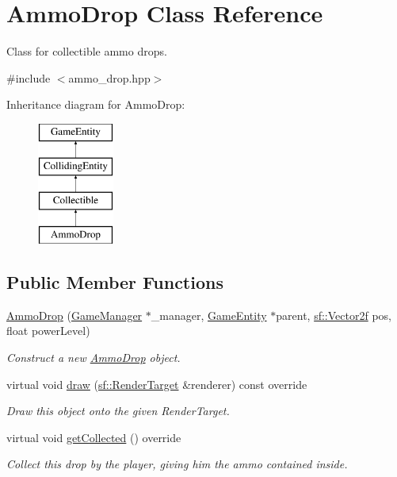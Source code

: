 \hypertarget{class_ammo_drop}{}\section{Ammo\+Drop Class Reference}
\label{class_ammo_drop}


Class for collectible ammo drops.  




{\ttfamily \#include $<$ammo\+\_\+drop.\+hpp$>$}

Inheritance diagram for Ammo\+Drop\+:\begin{figure}[H]
\begin{center}
\leavevmode
\includegraphics[height=4.000000cm]{class_ammo_drop}
\end{center}
\end{figure}
\subsection*{Public Member Functions}
\begin{DoxyCompactItemize}
\item 
\mbox{\hyperlink{class_ammo_drop_a996b802f8aff9538d9a2b11f266eb39f}{Ammo\+Drop}} (\mbox{\hyperlink{class_game_manager}{Game\+Manager}} $\ast$\+\_\+manager, \mbox{\hyperlink{class_game_entity}{Game\+Entity}} $\ast$parent, \mbox{\hyperlink{classsf_1_1_vector2}{sf\+::\+Vector2f}} pos, float power\+Level)
\begin{DoxyCompactList}\small\item\em Construct a new \mbox{\hyperlink{class_ammo_drop}{Ammo\+Drop}} object. \end{DoxyCompactList}\item 
virtual void \mbox{\hyperlink{class_ammo_drop_ab0c9da24a8f8c47b679705bed1b24cff}{draw}} (\mbox{\hyperlink{classsf_1_1_render_target}{sf\+::\+Render\+Target}} \&renderer) const override
\begin{DoxyCompactList}\small\item\em Draw this object onto the given Render\+Target. \end{DoxyCompactList}\item 
\mbox{\label{class_ammo_drop_a27a8f455baa991de4cee0d34ba81d293}} 
virtual void \mbox{\hyperlink{class_ammo_drop_a27a8f455baa991de4cee0d34ba81d293}{get\+Collected}} () override
\begin{DoxyCompactList}\small\item\em Collect this drop by the player, giving him the ammo contained inside. \end{DoxyCompactList}\end{DoxyCompactItemize}
